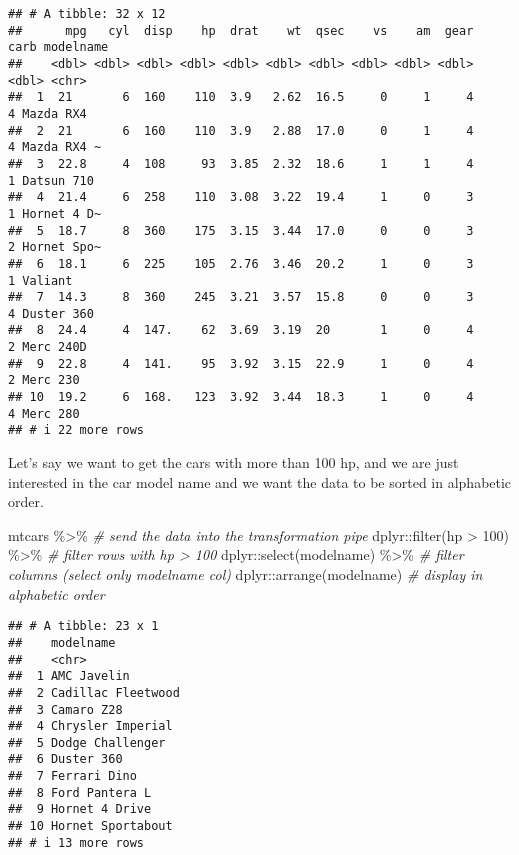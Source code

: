 \documentclass[
  oneside]{book}
\newenvironment{Shaded}{\begin{snugshade}}{\end{snugshade}}
\newcommand{\CommentTok}[1]{\textcolor[rgb]{0.56,0.35,0.01}{\textit{#1}}}
\newcommand{\DecValTok}[1]{\textcolor[rgb]{0.00,0.00,0.81}{#1}}
\newcommand{\FunctionTok}[1]{\textcolor[rgb]{0.00,0.00,0.00}{#1}}
\newcommand{\NormalTok}[1]{#1}
\newcommand{\SpecialCharTok}[1]{\textcolor[rgb]{0.00,0.00,0.00}{#1}}
\begin{document}
\begin{verbatim}
## # A tibble: 32 x 12
##      mpg   cyl  disp    hp  drat    wt  qsec    vs    am  gear  carb modelname  
##    <dbl> <dbl> <dbl> <dbl> <dbl> <dbl> <dbl> <dbl> <dbl> <dbl> <dbl> <chr>      
##  1  21       6  160    110  3.9   2.62  16.5     0     1     4     4 Mazda RX4  
##  2  21       6  160    110  3.9   2.88  17.0     0     1     4     4 Mazda RX4 ~
##  3  22.8     4  108     93  3.85  2.32  18.6     1     1     4     1 Datsun 710 
##  4  21.4     6  258    110  3.08  3.22  19.4     1     0     3     1 Hornet 4 D~
##  5  18.7     8  360    175  3.15  3.44  17.0     0     0     3     2 Hornet Spo~
##  6  18.1     6  225    105  2.76  3.46  20.2     1     0     3     1 Valiant    
##  7  14.3     8  360    245  3.21  3.57  15.8     0     0     3     4 Duster 360 
##  8  24.4     4  147.    62  3.69  3.19  20       1     0     4     2 Merc 240D  
##  9  22.8     4  141.    95  3.92  3.15  22.9     1     0     4     2 Merc 230   
## 10  19.2     6  168.   123  3.92  3.44  18.3     1     0     4     4 Merc 280   
## # i 22 more rows
\end{verbatim}

Let's say we want to get the cars with more than 100 hp, and we are just
interested in the car model name and we want the data to be sorted in alphabetic
order.

\begin{Shaded}
\begin{Highlighting}[]
\NormalTok{mtcars }\SpecialCharTok{\%\textgreater{}\%} \CommentTok{\# send the data into the transformation pipe}
\NormalTok{  dplyr}\SpecialCharTok{::}\FunctionTok{filter}\NormalTok{(hp }\SpecialCharTok{\textgreater{}} \DecValTok{100}\NormalTok{) }\SpecialCharTok{\%\textgreater{}\%} \CommentTok{\# filter rows with hp \textgreater{} 100}
\NormalTok{  dplyr}\SpecialCharTok{::}\FunctionTok{select}\NormalTok{(modelname) }\SpecialCharTok{\%\textgreater{}\%} \CommentTok{\# filter columns (select only modelname col)}
\NormalTok{  dplyr}\SpecialCharTok{::}\FunctionTok{arrange}\NormalTok{(modelname) }\CommentTok{\# display in alphabetic order}
\end{Highlighting}
\end{Shaded}

\begin{verbatim}
## # A tibble: 23 x 1
##    modelname         
##    <chr>             
##  1 AMC Javelin       
##  2 Cadillac Fleetwood
##  3 Camaro Z28        
##  4 Chrysler Imperial 
##  5 Dodge Challenger  
##  6 Duster 360        
##  7 Ferrari Dino      
##  8 Ford Pantera L    
##  9 Hornet 4 Drive    
## 10 Hornet Sportabout 
## # i 13 more rows
\end{verbatim}
\end{document}
